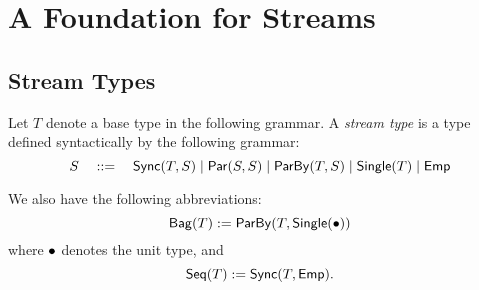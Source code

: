 \section{A Foundation for Streams}
\label{sec:foundation}



\subsection{Stream Types}


\begin{definition}
Let $T$ denote a base type in the following grammar.
A \emph{stream type} is a type defined syntactically by the following grammar:
\[
  S \quad ::= \quad
    \mathsf{Sync}({T}, S) \mid
    \mathsf{Par}({S}, {S}) \mid
    \mathsf{ParBy}({T}, S) \mid
    \mathsf{Single}(T) \mid
    \mathsf{Emp}{}
\]
\end{definition}

We also have the following abbreviations:
\[
  \mathsf{Bag}({T}) := \mathsf{ParBy}({T}, \mathsf{Single}(\bullet{}))
\]
where $\bullet{}$ denotes the unit type, and
\[
  \mathsf{Seq}({T}) := \mathsf{Sync}({T}, \mathsf{Emp}{}).
\]

